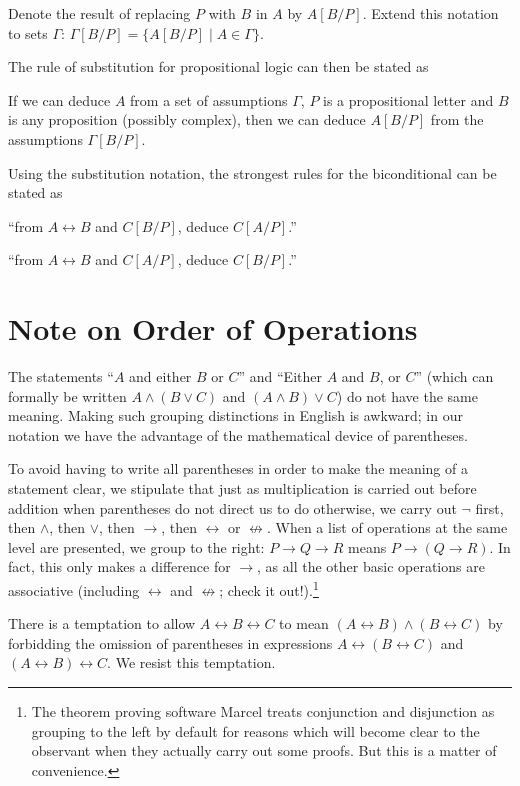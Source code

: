 \documentclass[12pt]{book}
\begin{document}
Denote the result of replacing $P$ with $B$ in $A$ by $A[B/P]$.
Extend this notation to sets $\Gamma$: $\Gamma[B/P] = \{A[B/P]\mid
A\in \Gamma\}$.

The rule of substitution for propositional logic can then be stated as

If we can deduce $A$ from a set of assumptions $\Gamma$, $P$ is a
propositional letter and $B$ is any proposition (possibly complex),
then we can deduce $A[B/P]$ from the assumptions $\Gamma[B/P]$.

Using the substitution notation, the strongest rules for the
biconditional can be stated as

``from $A\leftrightarrow B$ and $C[B/P]$, deduce $C[A/P]$.''

``from $A\leftrightarrow B$ and $C[A/P]$, deduce $C[B/P]$.''

\section{Note on Order of Operations}

The statements ``$A$ and either $B$ or $C$'' and ``Either $A$ and $B$,
or $C$'' (which can formally be written $A \wedge (B \vee C)$ and $(A
\wedge B) \vee C$) do not have the same meaning.  Making such grouping
distinctions in English is awkward; in our notation we have the
advantage of the mathematical device of parentheses.

To avoid having to write all parentheses in order to make the meaning
of a statement clear, we stipulate that just as multiplication is
carried out before addition when parentheses do not direct us to do
otherwise, we carry out $\neg$ first, then $\wedge$, then
$\vee$, then $\rightarrow$, then $\leftrightarrow$ or $\not\leftrightarrow$.  When a list of
operations at the same level are presented, we group to the right: $P
\rightarrow Q \rightarrow R$ means $P \rightarrow (Q \rightarrow R)$.
In fact, this only makes a difference for $\rightarrow$, as all the
other basic operations are associative (including $\leftrightarrow$ and
$\not\leftrightarrow$; check it out!).\footnote{The theorem proving software Marcel treats conjunction and disjunction as grouping to the left by default for reasons which will become clear to the observant when they actually carry out some proofs.  But this is a matter of convenience.}

There is a temptation to allow $A \leftrightarrow B \leftrightarrow C$ to mean $(A
\leftrightarrow B) \wedge (B \leftrightarrow C)$ by forbidding the omission of
parentheses in expressions $A \leftrightarrow (B \leftrightarrow C)$ and $(A \leftrightarrow B)
\leftrightarrow C$.  We resist this temptation.
\end{document}
